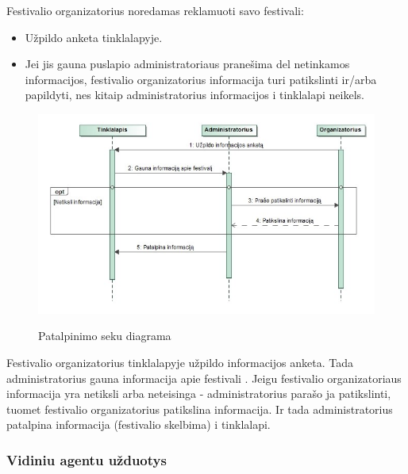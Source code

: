 ﻿\documentclass{VUMIFPSkursinis}
\begin{document}
Festivalio organizatorius noredamas reklamuoti savo festivali:
\begin{itemize}
\item Užpildo anketa tinklalapyje.
\item Jei jis gauna puslapio administratoriaus pranešima del netinkamos informacijos, festivalio organizatorius informacija turi patikslinti ir/arba papildyti, nes kitaip administratorius informacijos i tinklalapi neikels.
\end{itemize}

\begin{figure}[H]
    \centering
    \includegraphics[scale=0.7]{img/geri/_Organizatorius}
    \label{img:uml12}
	\caption{Patalpinimo seku diagrama}
\end{figure}

Festivalio organizatorius tinklalapyje užpildo informacijos anketa. Tada administratorius gauna informacija apie festivali . Jeigu festivalio organizatoriaus informacija yra netiksli arba neteisinga - administratorius parašo ja patikslinti, tuomet festivalio organizatorius patikslina informacija. Ir tada administratorius patalpina informacija (festivalio skelbima) i tinklalapi.

\subsubsection{Vidiniu agentu užduotys} 
\end{document}
